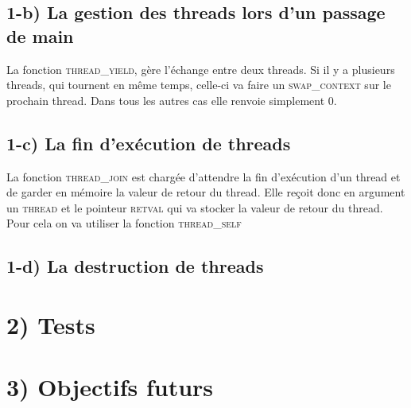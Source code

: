 \documentclass{report}
\begin{document}
\subsection*{1-b) La gestion des threads lors d'un passage de main}
La fonction \textsc{thread\_yield}, gère l'échange entre deux threads.
Si il y a plusieurs threads, qui tournent en même temps, celle-ci va faire un \textsc{swap\_context} sur le prochain thread.
Dans tous les autres cas elle renvoie simplement 0.

\subsection*{1-c) La fin d'exécution de threads}
La fonction \textsc{thread\_join} est chargée d'attendre la fin d'exécution d'un thread et de garder en mémoire la valeur de retour du thread.
Elle reçoit donc en argument un \textsc{thread} et le pointeur \textsc{retval} qui va stocker la valeur de retour du thread.
Pour cela on va utiliser la fonction \textsc{thread_self}


\subsection*{1-d) La destruction de threads}

\section*{2) Tests}

\section*{3) Objectifs futurs}
\end{document}
